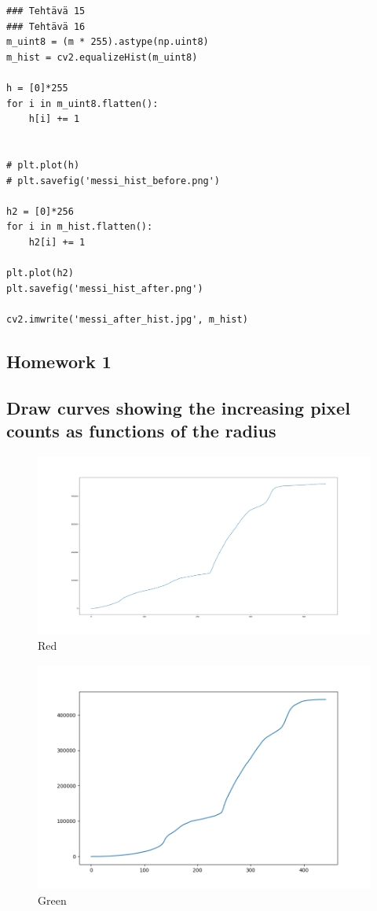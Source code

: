 \documentclass{article}
\begin{document}
\begin{verbatim}
### Tehtävä 15
### Tehtävä 16
m_uint8 = (m * 255).astype(np.uint8)
m_hist = cv2.equalizeHist(m_uint8)

h = [0]*255
for i in m_uint8.flatten():
    h[i] += 1
    

# plt.plot(h)
# plt.savefig('messi_hist_before.png')

h2 = [0]*256
for i in m_hist.flatten():
    h2[i] += 1

plt.plot(h2)
plt.savefig('messi_hist_after.png')

cv2.imwrite('messi_after_hist.jpg', m_hist)
\end{verbatim}

\subsection{Homework 1}

\subsection{Draw curves showing the increasing pixel counts as functions of the radius}
    
    \begin{figure}[h]
        \centering
        \includegraphics[scale=0.25]{pixels_per_radiu}
        \caption{Red}
    \end{figure}

    \begin{figure}[h]
        \centering
        \includegraphics[scale=0.50]{pixels_per_radiu_green}
        \caption{Green}
    \end{figure}
\end{document}
